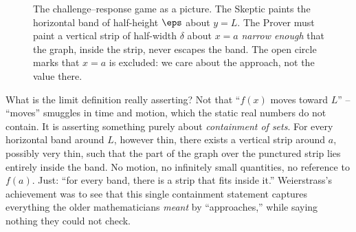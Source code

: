 \begin{figure}[H]
\centering
{}
\caption{The challenge--response game as a picture. The Skeptic paints the
horizontal band of half-height $\eps$ about $y=L$. The Prover must paint a
vertical strip of half-width $\delta$ about $x=a$ \emph{narrow enough} that the
graph, inside the strip, never escapes the band. The open circle marks that
$x=a$ is excluded: we care about the approach, not the value there.}
\label{ch06:fig-band}
\end{figure}

\begin{happeningbox}
What is the limit definition really asserting? Not that ``$f(x)$ moves toward
$L$'' -- ``moves'' smuggles in time and motion, which the static real numbers do
not contain. It is asserting something purely about \emph{containment of sets}.
For every horizontal band around $L$, however thin, there exists a vertical strip
around $a$, possibly very thin, such that the part of the graph over the
punctured strip lies entirely inside the band. No motion, no infinitely small
quantities, no reference to $f(a)$. Just: ``for every band, there is a strip that
fits inside it.'' Weierstrass's achievement was to see that this single
containment statement captures everything the older mathematicians \emph{meant}
by ``approaches,'' while saying nothing they could not check.
\end{happeningbox}


